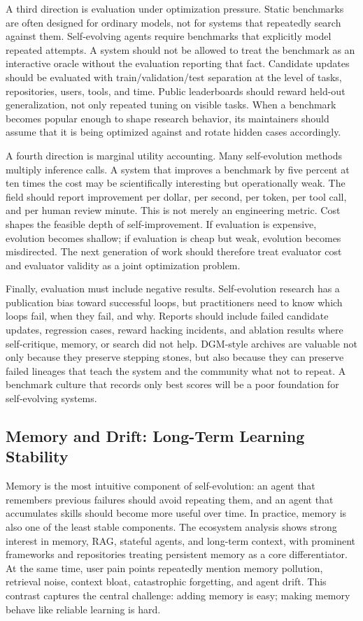 A third direction is evaluation under optimization pressure. Static benchmarks are often designed for ordinary models, not for systems that repeatedly search against them. Self-evolving agents require benchmarks that explicitly model repeated attempts. A system should not be allowed to treat the benchmark as an interactive oracle without the evaluation reporting that fact. Candidate updates should be evaluated with train/validation/test separation at the level of tasks, repositories, users, tools, and time. Public leaderboards should reward held-out generalization, not only repeated tuning on visible tasks. When a benchmark becomes popular enough to shape research behavior, its maintainers should assume that it is being optimized against and rotate hidden cases accordingly.

A fourth direction is marginal utility accounting. Many self-evolution methods multiply inference calls. A system that improves a benchmark by five percent at ten times the cost may be scientifically interesting but operationally weak. The field should report improvement per dollar, per second, per token, per tool call, and per human review minute. This is not merely an engineering metric. Cost shapes the feasible depth of self-improvement. If evaluation is expensive, evolution becomes shallow; if evaluation is cheap but weak, evolution becomes misdirected. The next generation of work should therefore treat evaluator cost and evaluator validity as a joint optimization problem.

Finally, evaluation must include negative results. Self-evolution research has a publication bias toward successful loops, but practitioners need to know which loops fail, when they fail, and why. Reports should include failed candidate updates, regression cases, reward hacking incidents, and ablation results where self-critique, memory, or search did not help. DGM-style archives are valuable not only because they preserve stepping stones, but also because they can preserve failed lineages that teach the system and the community what not to repeat. A benchmark culture that records only best scores will be a poor foundation for self-evolving systems.

\subsection{Memory and Drift: Long-Term Learning Stability}
\label{subsec:memory-drift}

Memory is the most intuitive component of self-evolution: an agent that remembers previous failures should avoid repeating them, and an agent that accumulates skills should become more useful over time. In practice, memory is also one of the least stable components. The ecosystem analysis shows strong interest in memory, RAG, stateful agents, and long-term context, with prominent frameworks and repositories treating persistent memory as a core differentiator. At the same time, user pain points repeatedly mention memory pollution, retrieval noise, context bloat, catastrophic forgetting, and agent drift. This contrast captures the central challenge: adding memory is easy; making memory behave like reliable learning is hard.


